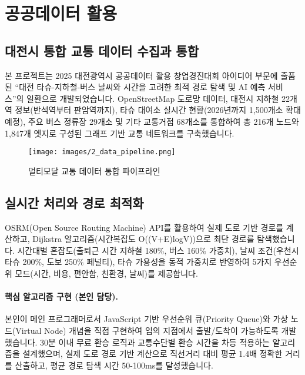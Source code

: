 \section{공공데이터 활용}

\subsection{대전시 통합 교통 데이터 수집과 통합}
본 프로젝트는 2025 대전광역시 공공데이터 활용 창업경진대회 아이디어 부문에 출품된 ``대전 타슈-지하철-버스 날씨와 시간을 고려한 최적 경로 탐색 및 AI 예측 서비스''의 일환으로 개발되었습니다. OpenStreetMap 도로망 데이터, 대전시 지하철 22개역 정보(반석역부터 판암역까지), 타슈 대여소 실시간 현황(2026년까지 1,500개소 확대 예정), 주요 버스 정류장 29개소 및 기타 교통거점 68개소를 통합하여 총 216개 노드와 1,847개 엣지로 구성된 그래프 기반 교통 네트워크를 구축했습니다.

\begin{figure}[H]
    \centering
    \texttt{[image: images/2\_data\_pipeline.png]}
    \caption{멀티모달 교통 데이터 통합 파이프라인}
    \label{fig:data_pipeline}
\end{figure}

\subsection{실시간 처리와 경로 최적화}
OSRM(Open Source Routing Machine) API를 활용하여 실제 도로 기반 경로를 계산하고, Dijkstra 알고리즘(시간복잡도 O((V+E)logV))으로 최단 경로를 탐색했습니다. 시간대별 혼잡도(출퇴근 시간 지하철 180\%, 버스 160\% 가중치), 날씨 조건(우천시 타슈 200\%, 도보 250\% 페널티), 타슈 가용성을 동적 가중치로 반영하여 5가지 우선순위 모드(시간, 비용, 편안함, 친환경, 날씨)를 제공합니다.

\paragraph{핵심 알고리즘 구현 (본인 담당).} 본인이 메인 프로그래머로서 JavaScript 기반 우선순위 큐(Priority Queue)와 가상 노드(Virtual Node) 개념을 직접 구현하여 임의 지점에서 출발/도착이 가능하도록 개발했습니다. 30분 이내 무료 환승 로직과 교통수단별 환승 시간을 차등 적용하는 알고리즘을 설계했으며, 실제 도로 경로 기반 계산으로 직선거리 대비 평균 1.4배 정확한 거리를 산출하고, 평균 경로 탐색 시간 50-100ms를 달성했습니다.

